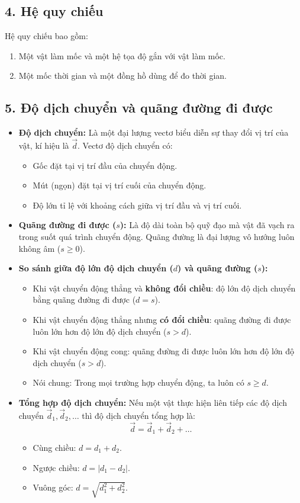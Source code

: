 \subsection*{4. Hệ quy chiếu}
Hệ quy chiếu bao gồm:
\begin{enumerate}[\bfseries 1.]
    \item Một vật làm mốc và một hệ tọa độ gắn với vật làm mốc.
    \item Một mốc thời gian và một đồng hồ dùng để đo thời gian.
\end{enumerate}

\subsection*{5. Độ dịch chuyển và quãng đường đi được}
\begin{itemize}
    \item \textbf{Độ dịch chuyển:} Là một đại lượng vectơ biểu diễn sự thay đổi vị trí của vật, kí hiệu là $\vec{d}$. Vectơ độ dịch chuyển có:
    \begin{itemize}
        \item Gốc đặt tại vị trí đầu của chuyển động.
        \item Mút (ngọn) đặt tại vị trí cuối của chuyển động.
        \item Độ lớn tỉ lệ với khoảng cách giữa vị trí đầu và vị trí cuối.
    \end{itemize}
    \item \textbf{Quãng đường đi được ($s$):} Là độ dài toàn bộ quỹ đạo mà vật đã vạch ra trong suốt quá trình chuyển động. Quãng đường là đại lượng vô hướng luôn không âm ($s \ge 0$).
    \item \textbf{So sánh giữa độ lớn độ dịch chuyển ($d$) và quãng đường ($s$):}
    \begin{itemize}
        \item Khi vật chuyển động thẳng và \textbf{không đổi chiều}: độ lớn độ dịch chuyển bằng quãng đường đi được ($d = s$).
        \item Khi vật chuyển động thẳng nhưng \textbf{có đổi chiều}: quãng đường đi được luôn lớn hơn độ lớn độ dịch chuyển ($s > d$).
        \item Khi vật chuyển động cong: quãng đường đi được luôn lớn hơn độ lớn độ dịch chuyển ($s > d$).
        \item Nói chung: Trong mọi trường hợp chuyển động, ta luôn có $s \ge d$.
    \end{itemize}
    \item \textbf{Tổng hợp độ dịch chuyển:} Nếu một vật thực hiện liên tiếp các độ dịch chuyển $\vec{d}_1, \vec{d}_2,\dots$ thì độ dịch chuyển tổng hợp là:
    \[
    \vec{d} = \vec{d}_1 + \vec{d}_2 + \dots
    \]
    \begin{itemize}
        \item Cùng chiều: $d = d_1 + d_2$.
        \item Ngược chiều: $d = |d_1 - d_2|$.
        \item Vuông góc: $d = \sqrt{d_1^2 + d_2^2}$.
    \end{itemize}
\end{itemize}



